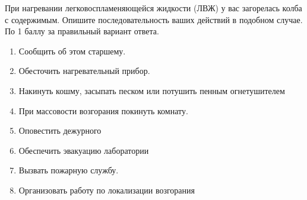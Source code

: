 
При нагревании легковоспламеняющейся жидкости (ЛВЖ) у вас загорелась колба с содержимым. Опишите последовательность ваших действий в подобном случае.
По 1 баллу за правильный вариант ответа.

\answerMath

\begin{enumerate}
    \item Сообщить об этом старшему.
    \item Обесточить нагревательный прибор.
    \item Накинуть кошму, засыпать песком или потушить пенным огнетушителем
    \item При массовости возгорания покинуть комнату.
    \item Оповестить дежурного
    \item Обеспечить эвакуацию лаборатории
    \item Вызвать пожарную службу.
    \item Организовать работу по локализации возгорания
\end{enumerate}
